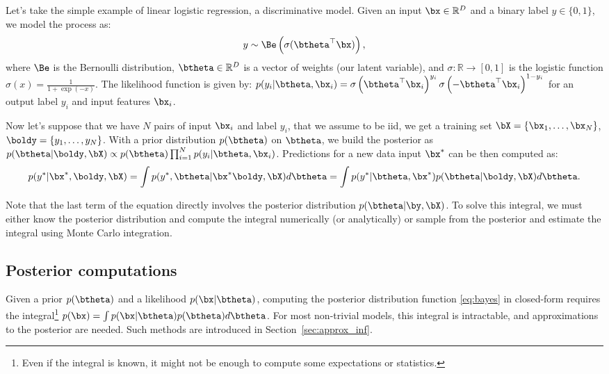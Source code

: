Let's take the simple example of linear logistic regression, a discriminative model.
Given an input $\bx \in \mathbb{R}^D$ and a binary label $y\in \{ 0, 1\}$, we model the process as:
\begin{align}
    y \sim \Be\left(\sigma(\btheta^\top \bx)\right),
\end{align}
where $\Be$ is the Bernoulli distribution, $\btheta\in\mathbb{R}^D$ is a vector of weights (our latent variable), and $\sigma : \mathbb{R} \to [0, 1]$ is the logistic function $\sigma(x) = \frac{1}{1 + \exp(-x)}$.
The likelihood function is given by: $p(y_i|\btheta,\bx_i) =\sigma\left(\btheta^\top \bx_i\right)^{y_i}\sigma\left(-\btheta^\top \bx_i\right)^{1-y_i}$ for an output label $y_i$ and input features $\bx_i$.

Now let's suppose that we have $N$ pairs of input $\bx_i$ and label $y_i$, that we assume to be \ac{iid}, we get a training set $\bX = \{\bx_1,\ldots,\bx_N\}$, $\boldy = \{y_1,\ldots,y_N\}$.
With a prior distribution $p(\btheta)$ on $\btheta$, we build the posterior as $p(\btheta|\boldy,\bX) \propto p(\btheta)\prod_{i=1}^N p(y_i|\btheta, \bx_i)$.
Predictions for a new data input $\bx^*$ can be then computed as:
\begin{align}
p(y^*|\bx^*,\boldy,\bX) = \int p(y^*, \btheta|\bx^*\boldy, \bX)d\btheta = \int p(y^*|\btheta,\bx^*) p(\btheta|\boldy,\bX)d\btheta.
\end{align}

Note that the last term of the equation directly involves the posterior distribution $p(\btheta|\by,\bX)$.
To solve this integral, we must either know the posterior distribution and compute the integral numerically (or analytically) or sample from the posterior and estimate the integral using Monte Carlo integration.

\subsection{Posterior computations}
\label{sec:posterior}
Given a prior $p(\btheta)$ and a likelihood $p(\bx|\btheta)$, computing the posterior distribution function \eqref{eq:bayes} in closed-form requires the integral\footnote{Even if the integral is known, it might not be enough to compute some expectations or statistics.} $p(\bx)=\int p(\bx|\btheta)p(\btheta)d\btheta$.
For most non-trivial models, this integral is intractable, and approximations to the posterior are needed.
Such methods are introduced in Section~\ref{sec:approx_inf}.

